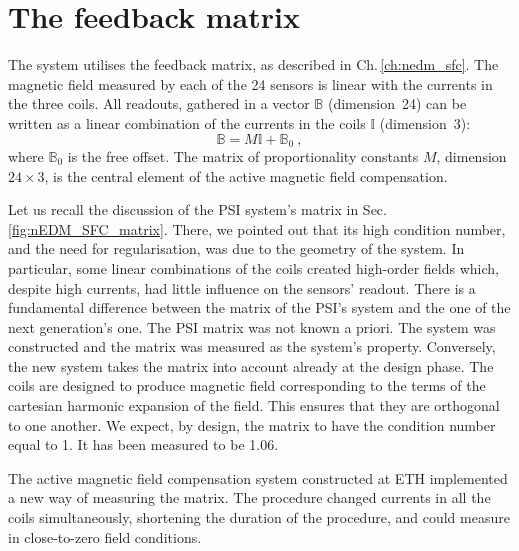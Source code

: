 \section{The feedback matrix}
The system utilises the feedback matrix, as described in Ch.\,\ref{ch:nedm_sfc}. The magnetic field measured by each of the 24 sensors is linear with the currents in the three coils. All readouts, gathered in a vector $\mathbb{B}$ (dimension~24) can be written as a linear combination of the currents in the coils $\mathbb{I}$ (dimension~3):
\begin{equation}
  \label{eq:SFC_matrix_model}
  \mathbb{B} = M \mathbb{I} + \mathbb{B}_0 \ ,
\end{equation}
where $\mathbb{B}_0$ is the free offset. The matrix of proportionality constants $M$, dimension $24 \times 3$, is the central element of the active magnetic field compensation.

Let us recall the discussion of the PSI system's matrix in Sec.\,\ref{fig:nEDM_SFC_matrix}. There, we pointed out that its high condition number, and the need for regularisation, was due to the geometry of the system. In particular, some linear combinations of the coils created high-order fields which, despite high currents, had little influence on the sensors' readout.
There is a fundamental difference between the matrix of the PSI's system and the one of the next generation's one. The PSI matrix was not known a priori. The system was constructed and the matrix was measured as the system's property.
Conversely, the new system takes the matrix into account already at the design phase. The coils are designed to produce magnetic field corresponding to the terms of the cartesian harmonic expansion of the field.
This ensures that they are orthogonal to one another. We expect, by design, the matrix to have the condition number equal to 1. It has been measured to be 1.06.


The active magnetic field compensation system constructed at ETH implemented a new way of measuring the matrix. The procedure changed currents in all the coils simultaneously, shortening the duration of the procedure, and could measure in close-to-zero field conditions.


